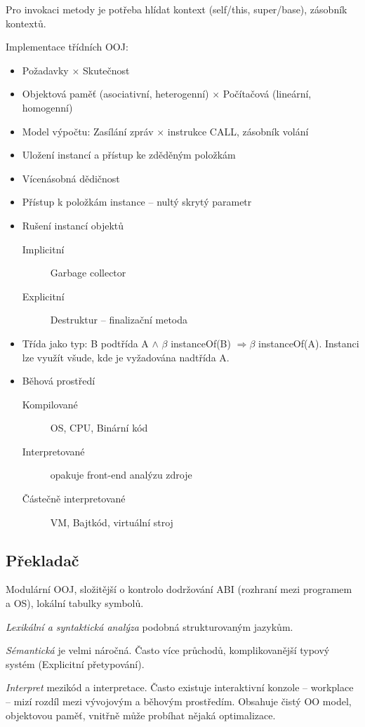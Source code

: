 \documentclass[a4wide]{report}
\begin{document}
Pro invokaci metody je potřeba hlídat kontext (self/this, super/base), zásobník kontextů.

Implementace třídních OOJ:
\begin{itemize}
	\item Požadavky $\times$ Skutečnost
	\item Objektová paměť (asociativní, heterogenní) $\times$ Počítačová (lineární, homogenní)
	\item Model výpočtu: Zasílání zpráv $\times$ instrukce CALL, zásobník volání
	\item Uložení instancí a přístup ke zděděným položkám
	\item Vícenásobná dědičnost
	\item Přístup k položkám instance -- nultý skrytý parametr
	\item Rušení instancí objektů
	\begin{description}
		\item[Implicitní] Garbage collector
		\item[Explicitní] Destruktur -- finalizační metoda
	\end{description}
	\item Třída jako typ: B podtřída A $\land$ $\beta$ instanceOf(B) $ \Rightarrow \beta $ instanceOf(A). Instanci lze využít všude, kde je vyžadována nadtřída A. 
	\item Běhová prostředí
	\begin{description}
		\item[Kompilované] OS, CPU, Binární kód
		\item[Interpretované] opakuje front-end analýzu zdroje
		\item[Částečně interpretované] VM, Bajtkód, virtuální stroj
	\end{description}
\end{itemize}

\subsection{Překladač}
Modulární OOJ, složitější o kontrolo dodržování ABI (rozhraní mezi programem a OS), lokální tabulky symbolů.

\emph{Lexikální a syntaktická analýza} podobná strukturovaným jazykům.

\emph{Sémantická} je velmi náročná. Často více průchodů, komplikovanější typový systém (Explicitní přetypování).

\emph{Interpret} mezikód a interpretace. Často existuje interaktivní konzole -- workplace -- mizí rozdíl mezi vývojovým a běhovým prostředím. Obsahuje čistý OO model, objektovou paměť, vnitřně může probíhat nějaká optimalizace.
\end{document}
